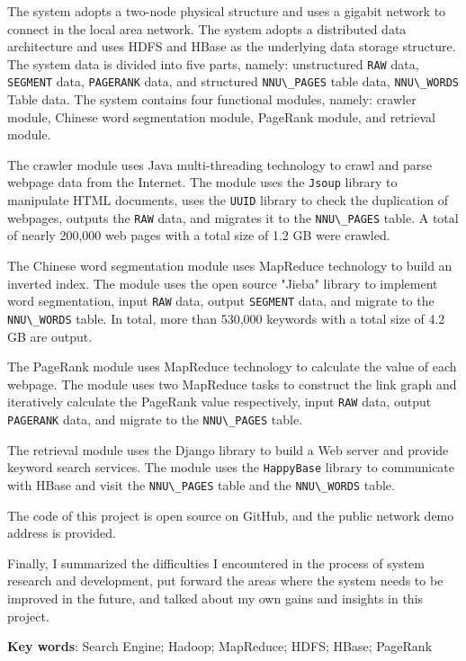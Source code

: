 \documentclass{ctexart}
\newcommand{\code}[1]{\colorbox{backcolor}{\lstinline|#1|}}
\begin{document}
    The system adopts a two-node physical structure and uses a gigabit network to connect in the local area network. The system adopts a distributed data architecture and uses HDFS and HBase as the underlying data storage structure. The system data is divided into five parts, namely: unstructured \code{RAW} data, \code{SEGMENT} data, \code{PAGERANK} data, and structured \code{NNU\_PAGES} table data, \code{NNU\_WORDS} Table data. The system contains four functional modules, namely: crawler module, Chinese word segmentation module, PageRank module, and retrieval module.

    The crawler module uses Java multi-threading technology to crawl and parse webpage data from the Internet. The module uses the \code{Jsoup} library to manipulate HTML documents, uses the \code{UUID} library to check the duplication of webpages, outputs the \code{RAW} data, and migrates it to the \code{NNU\_PAGES} table. A total of nearly 200,000 web pages with a total size of 1.2 GB were crawled.

    The Chinese word segmentation module uses MapReduce technology to build an inverted index. The module uses the open source "Jieba" library to implement word segmentation, input \code{RAW} data, output \code{SEGMENT} data, and migrate to the \code{NNU\_WORDS} table. In total, more than 530,000 keywords with a total size of 4.2 GB are output.

    The PageRank module uses MapReduce technology to calculate the value of each webpage. The module uses two MapReduce tasks to construct the link graph and iteratively calculate the PageRank value respectively, input \code{RAW} data, output \code{PAGERANK} data, and migrate to the \code{NNU\_PAGES} table.

    The retrieval module uses the Django library to build a Web server and provide keyword search services. The module uses the \code{HappyBase} library to communicate with HBase and visit the \code{NNU\_PAGES} table and the \code{NNU\_WORDS} table.

    The code of this project is open source on GitHub, and the public network demo address is provided.

    Finally, I summarized the difficulties I encountered in the process of system research and development, put forward the areas where the system needs to be improved in the future, and talked about my own gains and insights in this project.

    \textbf{Key words}: Search Engine; Hadoop; MapReduce; HDFS; HBase; PageRank
\end{document}
